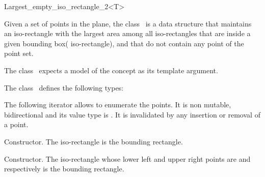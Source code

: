 

\begin{ccRefClass}{Largest_empty_iso_rectangle_2<T>}


\ccDefinition
  
Given a set of points in the plane, the class \ccRefName\ is a data
structure that maintains an iso-rectangle with the largest area among
all iso-rectangles that are inside a given bounding box( iso-rectangle), and
that do not contain any point of the point set.

The class \ccRefName\ expects a model of the concept  as its template argument.  



\ccTypes
The class \ccClassTemplateName\ defines the following types:

\ccThreeToTwo


\ccGlue
{}


The following iterator allows to enumerate the points. 
It is non mutable, bidirectional
and its value type is . 
It is invalidated by any insertion or removal of a point. 



\ccCreation
{}  %

{Constructor. The iso-rectangle  is the bounding rectangle.} 

{Constructor. The iso-rectangle whose lower left and upper right points are  and
 respectively is the bounding rectangle.} 


\end{ccRefClass}
